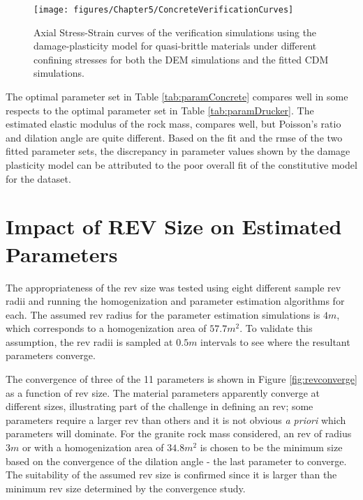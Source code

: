 \begin{figure}[!htb]
\begin{center}
\texttt{[image: figures/Chapter5/ConcreteVerificationCurves]}
\caption{{\label{fig:concreteverify} Axial Stress-Strain curves of the verification simulations using the damage-plasticity model for quasi-brittle materials under different confining stresses for both the DEM simulations and the fitted CDM simulations.%
}}
\end{center}
\end{figure}

The optimal parameter set in Table \ref{tab:paramConcrete} compares well in some respects to the optimal parameter set in Table \ref{tab:paramDrucker}. The estimated elastic modulus of the rock mass, compares well, but Poisson's ratio and dilation angle are quite different. Based on the fit and the \acrshort{rmse} of the two fitted parameter sets, the discrepancy in parameter values shown by the damage plasticity model can be attributed to the poor overall fit of the constitutive model for the dataset. 

\section{Impact of REV Size on Estimated Parameters}

The appropriateness of the \acrshort{rev} size was tested using eight different sample \acrshort{rev} radii and running the homogenization and parameter estimation algorithms for each. The assumed \acrshort{rev} radius for the parameter estimation simulations is $4m$, which corresponds to a homogenization area of $57.7 m^2$. To validate this assumption, the \acrshort{rev} radii is sampled at $0.5m$ intervals to see where the resultant parameters converge.

The convergence of three of the 11 parameters is shown in Figure \ref{fig:revconverge} as a function of \acrshort{rev} size. The material parameters apparently converge at different sizes, illustrating part of the challenge in defining an \acrshort{rev}; some parameters require a larger \acrshort{rev} than others and it is not obvious \textit{a priori} which parameters will dominate. For the granite rock mass considered, an \acrshort{rev} of radius $3m$ or with a homogenization area of $34.8 m^2$ is chosen to be the minimum size based on the convergence of the dilation angle - the last parameter to converge. The suitability of the assumed \acrshort{rev} size is confirmed since it is larger than the minimum \acrshort{rev} size determined by the convergence study.


